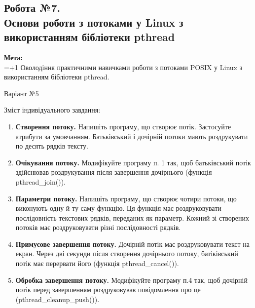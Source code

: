 \documentclass[a4paper,12pt]{article}
\begin{document}
\newpage
    \begin{center}
        \section*{\bfseries{Робота №7.\\
        Основи роботи з потоками у Linux з використанням бібліотеки pthread }}
    \end{center}
    \textbf{Мета:} \\
    \hangindent=1.5cm 
    \hangafter=+1 \noindent
    Оволодіння практичними навичками роботи з потоками POSIX у Linux з використанням бібліотеки pthread. \\
    \begin{center}
        \Large{Варіант №5}
    \end{center}
    Зміст індивідуального завдання:
    \begin{enumerate}
        \item \textbf{Створення потоку.} Напишіть програму, що створює потік.
        Застосуйте атрибути за умовчанням. Батьківський і дочірній потоки мають роздрукувати по десять рядків тексту.
        \item \textbf{Очікування потоку.} Модифікуйте програму п. 1 так, щоб
        батьківський потік здійснював роздрукування після завершення дочірнього (функція pthread\_join()).
        \item \textbf{Параметри потоку.} Напишіть програму, що створює чотири потоки, що виконують одну й ту саму функцію.
        Ця функція має роздруковувати послідовність текстових рядків, переданих як параметр. Кожний зі створених
        потоків має роздруковувати різні послідовності рядків.
        \item \textbf{Примусове завершення потоку.} Дочірній потік має роздруковувати текст на екран. Через дві секунди після
        створення дочірнього потоку, батіківський потік має перервати його (функція pthread\_cancel()).
        \item \textbf{Обробка завершення потоку.} Модифікуйте програму п.4 так, щоб дочірній потік перед завершенням
        роздруковував повідомлення про це (pthread\_cleanup\_push()).
    \end{enumerate}
\end{document}
